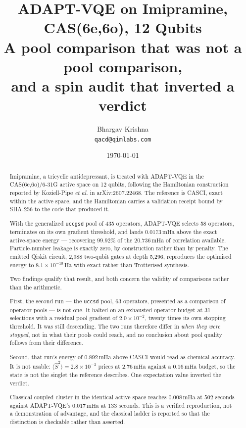 \documentclass[11pt,a4paper]{article}
\title{\vspace{-1.1cm}\textbf{ADAPT-VQE on Imipramine,\\
CAS(6e,6o), 12 Qubits}\\[0.4em]
\large A pool comparison that was not a pool comparison,\\
and a spin audit that inverted a verdict}
\author{Bhargav Krishna\\\small\texttt{qacd@qimlabs.com}}
\date{\today}
\newcommand{\mHa}{\ensuremath{\,\mathrm{mHa}}}
\newcommand{\Ha}{\ensuremath{\,\mathrm{Ha}}}
\newcommand{\Ssq}{\ensuremath{\langle \hat{S}^2 \rangle}}
\newcommand{\code}[1]{\texttt{\small #1}}
\begin{document}
\maketitle
\thispagestyle{fancy}

\begin{abstract}
\noindent
Imipramine, a tricyclic antidepressant, is treated with ADAPT-VQE in the
CAS(6e,6o)/6-31G active space on 12 qubits, following the Hamiltonian
construction reported by Koziell-Pipe \emph{et al.} in arXiv:2607.22468. The
reference is CASCI, exact within the active space, and the Hamiltonian carries
a validation receipt bound by SHA-256 to the code that produced it.

With the generalized \code{uccgsd} pool of 435 operators, ADAPT-VQE selects 58
operators, terminates on its own gradient threshold, and lands $0.0173\mHa$
above the exact active-space energy --- recovering $99.92\%$ of the
$20.736\mHa$ of correlation available. Particle-number leakage is exactly zero,
by construction rather than by penalty. The emitted Qiskit circuit, 2{,}988
two-qubit gates at depth 5{,}296, reproduces the optimised energy to
$8.1\times10^{-10}\Ha$ with exact rather than Trotterised synthesis.

Two findings qualify that result, and both concern the validity of comparisons
rather than the arithmetic.

First, the second run --- the \code{uccsd} pool, 63 operators, presented as a
comparison of operator pools --- is not one. It halted on an exhausted operator
budget at 31 selections with a residual pool gradient of $2.0\times10^{-2}$,
twenty times its own stopping threshold. It was still descending. The two runs
therefore differ in \emph{when they were stopped}, not in what their pools could
reach, and no conclusion about pool quality follows from their difference.

Second, that run's energy of $0.892\mHa$ above CASCI would read as chemical
accuracy. It is not usable: $\Ssq = 2.8\times10^{-3}$ prices at $2.76\mHa$
against a $0.16\mHa$ budget, so the state is not the singlet the reference
describes. One expectation value inverted the verdict.

Classical coupled cluster in the identical active space reaches $0.008\mHa$ at
$502$ seconds against ADAPT-VQE's $0.017\mHa$ at $133$ seconds. This is a
verified reproduction, not a demonstration of advantage, and the classical
ladder is reported so that the distinction is checkable rather than asserted.
\end{abstract}
\end{document}
